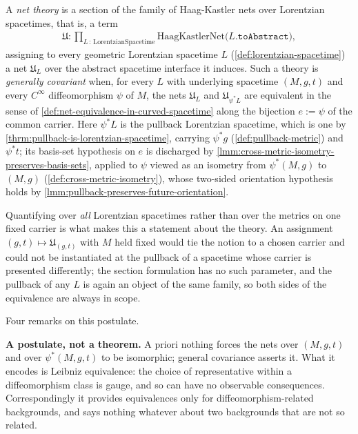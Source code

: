 \begin{definition}
    \label{def:general-covariance-in-curved-spacetime}
    A \emph{net theory} is a section of the family of Haag-Kastler nets over Lorentzian spacetimes, that is, a term
    \begin{align}
        \mathfrak{U} : \prod_{L \,:\, \mathrm{LorentzianSpacetime}} \mathrm{HaagKastlerNet}\big(L.\mathtt{toAbstract}\big),
    \end{align}
    assigning to every geometric Lorentzian spacetime $L$ (\ref{def:lorentzian-spacetime}) a net $\mathfrak{U}_L$ over the abstract spacetime interface it induces. Such a theory is \emph{generally covariant} when, for every $L$ with underlying spacetime $(M,g,t)$ and every $C^\infty$ diffeomorphism $\psi$ of $M$, the nets $\mathfrak{U}_L$ and $\mathfrak{U}_{\psi^*L}$ are equivalent in the sense of \ref{def:net-equivalence-in-curved-spacetime} along the bijection $e := \psi$ of the common carrier. Here $\psi^*L$ is the pullback Lorentzian spacetime, which is one by \ref{thrm:pullback-is-lorentzian-spacetime}, carrying $\psi^*g$ (\ref{def:pullback-metric}) and $\psi^*t$; its basis-set hypothesis on $e$ is discharged by \ref{lmm:cross-metric-isometry-preserves-basis-sets}, applied to $\psi$ viewed as an isometry from $\psi^*(M,g)$ to $(M,g)$ (\ref{def:cross-metric-isometry}), whose two-sided orientation hypothesis holds by \ref{lmm:pullback-preserves-future-orientation}.

    Quantifying over \emph{all} Lorentzian spacetimes rather than over the metrics on one fixed carrier is what makes this a statement about the theory. An assignment $(g,t) \mapsto \mathfrak{U}_{(g,t)}$ with $M$ held fixed would tie the notion to a chosen carrier and could not be instantiated at the pullback of a spacetime whose carrier is presented differently; the section formulation has no such parameter, and the pullback of any $L$ is again an object of the same family, so both sides of the equivalence are always in scope.
\end{definition}

Four remarks on this postulate.

\textbf{A postulate, not a theorem.} A priori nothing forces the nets over $(M,g,t)$ and over $\psi^*(M,g,t)$ to be isomorphic; general covariance asserts it. What it encodes is Leibniz equivalence: the choice of representative within a diffeomorphism class is gauge, and so can have no observable consequences. Correspondingly it provides equivalences only for diffeomorphism-related backgrounds, and says nothing whatever about two backgrounds that are not so related.

